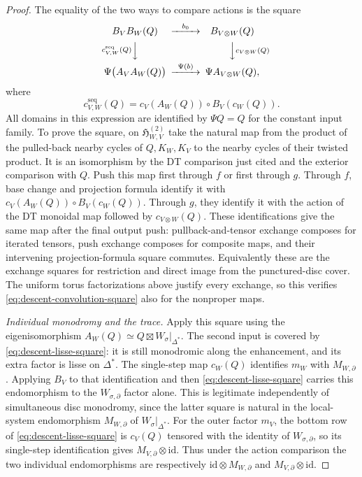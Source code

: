 \begin{proof}
The equality of the two ways to compare actions is the square
\begin{equation}\label{eq:descent-convolution-square}
\begin{CD}
 B_VB_W(Q) @>{b_0}>> B_{V\otimes W}(Q)\\
 @V{c^{\mathrm{seq}}_{V,W}(Q)}VV
     @VV{c_{V\otimes W}(Q)}V\\
 \Psi\bigl(A_VA_W(Q)\bigr)
    @>{\Psi(b)}>> \Psi A_{V\otimes W}(Q),
\end{CD}
\end{equation}
where
\[
 c^{\mathrm{seq}}_{V,W}(Q)
   =c_V(A_W(Q))\circ B_V(c_W(Q)).
\]
All domains in this expression are identified by $\Psi Q=Q$ for
the constant input family.  To prove the square, on
$\mathfrak H^{(2)}_{W,V}$ take the natural map from the product of
the pulled-back nearby cycles of $Q,K_W,K_V$ to the nearby cycles
of their twisted product.  It is an isomorphism by the DT
comparison just cited and the exterior comparison with $Q$.
Push this map first through $f$ or first through $g$.  Through $f$,
base change and projection formula identify it with
$c_V(A_W(Q))\circ B_V(c_W(Q))$.  Through $g$, they identify it with
the action of the DT monoidal map followed by
$c_{V\otimes W}(Q)$.  These identifications give the same map after
the final output push: pullback-and-tensor exchange composes for
iterated tensors, push exchange composes for composite maps, and
their intervening projection-formula square commutes.  Equivalently
these are the exchange squares for restriction and direct image
from the punctured-disc cover.  The uniform torus factorizations
above justify every exchange, so this verifies
\eqref{eq:descent-convolution-square} also for the nonproper maps.

\smallskip\noindent
\emph{Individual monodromy and the trace.}
Apply this square using the eigenisomorphism
$A_W(Q)\simeq Q\boxtimes W_\sigma|_{\Delta^*}$.
The second input is covered by \eqref{eq:descent-lisse-square}:
it is still monodromic along the enhancement, and its extra factor
is lisse on $\Delta^*$.  The single-step map $c_W(Q)$ identifies
$m_W$ with $M_{W,\partial}$.  Applying $B_V$ to that identification
and then \eqref{eq:descent-lisse-square} carries this endomorphism
to the $W_{\sigma,\partial}$ factor alone.  This is legitimate
independently of simultaneous disc monodromy, since the latter
square is natural in the local-system endomorphism
$M_{W,\partial}$ of $W_\sigma|_{\Delta^*}$.
For the outer factor $m_V$, the bottom row of
\eqref{eq:descent-lisse-square} is $c_V(Q)$ tensored with the
identity of $W_{\sigma,\partial}$, so its single-step identification
gives $M_{V,\partial}\otimes\mathrm{id}$.
Thus under the action comparison the two individual endomorphisms
are respectively $\mathrm{id}\otimes M_{W,\partial}$ and
$M_{V,\partial}\otimes\mathrm{id}$.


\end{proof}
